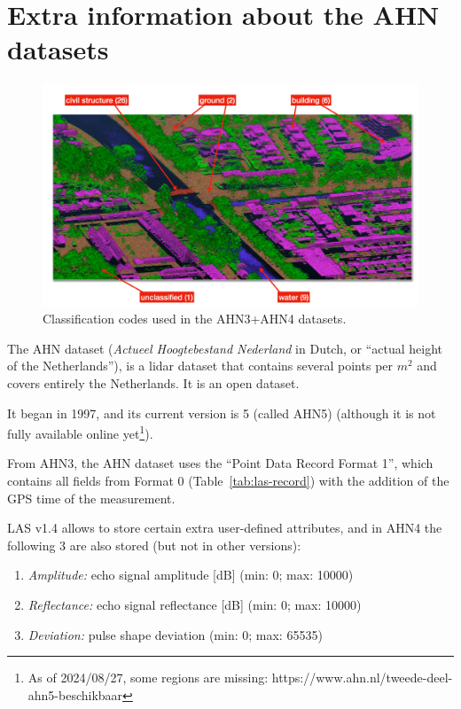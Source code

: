 
\graphicspath{{appendices/ahn/figs/}}

\chapter{Extra information about the AHN datasets}%
\label{app:ahn}


\begin{figure}
  \includegraphics[width=\linewidth]{ahn4.png}
  \caption{Classification codes used in the AHN3+AHN4 datasets.}%
\label{fig:ahn3}
\end{figure}

The AHN dataset (\emph{Actueel Hoogtebestand Nederland} in Dutch, or ``actual height of the Netherlands''), 
is a lidar dataset that contains several points per $m^2$ and covers entirely the Netherlands.
It is an open dataset.

It began in 1997, and its current version is 5 (called AHN5) (although it is not fully available online yet\footnote{As of 2024/08/27, some regions are missing: https://www.ahn.nl/tweede-deel-ahn5-beschikbaar}).

From AHN3, the AHN dataset uses the ``Point Data Record Format 1'', which contains all fields from Format 0 (Table~\ref{tab:las-record}) with the addition of the GPS time of the measurement.

LAS v1.4 allows to store certain extra user-defined attributes, and in AHN4 the following 3 are also stored (but not in other versions):
\begin{enumerate}
  \item \emph{Amplitude:} echo signal amplitude [dB] (min: 0; max: 10000) 
  \item \emph{Reflectance:} echo signal reflectance [dB] (min: 0; max: 10000)
  \item \emph{Deviation:} pulse shape deviation (min: 0; max: 65535)
\end{enumerate}


